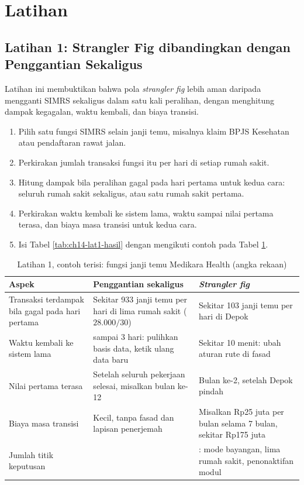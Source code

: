 \section{Latihan}

\subsection*{Latihan 1: Strangler Fig dibandingkan dengan Penggantian Sekaligus}

Latihan ini membuktikan bahwa pola \textit{strangler fig} lebih aman daripada mengganti SIMRS
sekaligus dalam satu kali peralihan, dengan menghitung dampak kegagalan, waktu kembali, dan biaya
transisi.

\begin{enumerate}
  \item Pilih satu fungsi SIMRS selain janji temu, misalnya klaim BPJS Kesehatan atau pendaftaran
        rawat jalan.
  \item Perkirakan jumlah transaksi fungsi itu per hari di setiap rumah sakit.
  \item Hitung dampak bila peralihan gagal pada hari pertama untuk kedua cara: seluruh rumah sakit
        sekaligus, atau satu rumah sakit pertama.
  \item Perkirakan waktu kembali ke sistem lama, waktu sampai nilai pertama terasa, dan biaya masa
        transisi untuk kedua cara.
  \item Isi Tabel \ref{tab:ch14-lat1-hasil} dengan mengikuti contoh pada Tabel
        \ref{tab:ch14-lat1-contoh}.
\end{enumerate}

\begin{table}[!htb]
  \centering
  \caption{Latihan 1, contoh terisi: fungsi janji temu Medikara Health (angka rekaan)}
  \label{tab:ch14-lat1-contoh}
  \footnotesize
  \begin{tabularx}{\textwidth}{>{\raggedright\arraybackslash}p{3.2cm}
      >{\raggedright\arraybackslash}X >{\raggedright\arraybackslash}X}
    \hline
    \textbf{Aspek} & \textbf{Penggantian sekaligus} & \textbf{\textit{Strangler fig}} \\ \hline
    Transaksi terdampak bila gagal pada hari pertama & Sekitar 933 janji temu per hari di lima
      rumah sakit ($28.000 / 30$) & Sekitar 103 janji temu per hari di Depok \\ \hline
    Waktu kembali ke sistem lama & 1 sampai 3 hari: pulihkan basis data, ketik ulang data baru &
      Sekitar 10 menit: ubah aturan rute di fasad \\ \hline
    Nilai pertama terasa & Setelah seluruh pekerjaan selesai, misalkan bulan ke-12 & Bulan ke-2,
      setelah Depok pindah \\ \hline
    Biaya masa transisi & Kecil, tanpa fasad dan lapisan penerjemah & Misalkan Rp25 juta per bulan
      selama 7 bulan, sekitar Rp175 juta \\ \hline
    Jumlah titik keputusan & 1 & 7: mode bayangan, lima rumah sakit, penonaktifan modul \\ \hline
  \end{tabularx}
\end{table}

